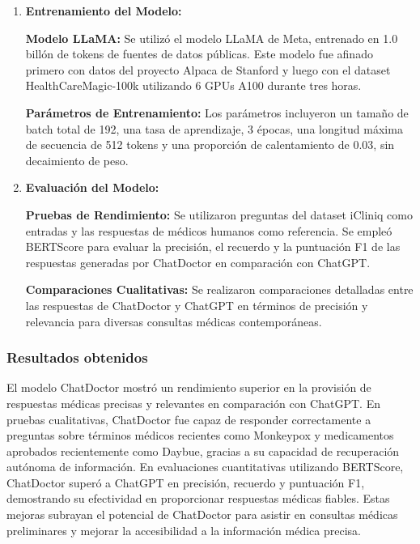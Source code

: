 \begin{enumerate}
		\item \textbf{Entrenamiento del Modelo:}
			
			\subitem \textbf{Modelo LLaMA:} Se utilizó el modelo LLaMA de Meta, entrenado en 1.0 billón de tokens de fuentes de datos públicas. Este modelo fue afinado primero con datos del proyecto Alpaca de Stanford y luego con el dataset HealthCareMagic-100k utilizando 6 GPUs A100 durante tres horas.
			
			\subitem \textbf{Parámetros de Entrenamiento:} Los parámetros incluyeron un tamaño de batch total de 192, una tasa de aprendizaje, 3 épocas, una longitud máxima de secuencia de 512 tokens y una proporción de calentamiento de 0.03, sin decaimiento de peso.
		
		\item \textbf{Evaluación del Modelo:}
			
			\subitem \textbf{Pruebas de Rendimiento:} Se utilizaron preguntas del dataset iCliniq como entradas y las respuestas de médicos humanos como referencia. Se empleó BERTScore para evaluar la precisión, el recuerdo y la puntuación F1 de las respuestas generadas por ChatDoctor en comparación con ChatGPT.
			
			\subitem \textbf{Comparaciones Cualitativas:} Se realizaron comparaciones detalladas entre las respuestas de ChatDoctor y ChatGPT en términos de precisión y relevancia para diversas consultas médicas contemporáneas.
	\end{enumerate}

\subsubsection{Resultados obtenidos}
	El modelo ChatDoctor mostró un rendimiento superior en la provisión de respuestas médicas precisas y relevantes en comparación con ChatGPT. En pruebas cualitativas, ChatDoctor fue capaz de responder correctamente a preguntas sobre términos médicos recientes como Monkeypox y medicamentos aprobados recientemente como Daybue, gracias a su capacidad de recuperación autónoma de información. En evaluaciones cuantitativas utilizando BERTScore, ChatDoctor superó a ChatGPT en precisión, recuerdo y puntuación F1, demostrando su efectividad en proporcionar respuestas médicas fiables. Estas mejoras subrayan el potencial de ChatDoctor para asistir en consultas médicas preliminares y mejorar la accesibilidad a la información médica precisa.

